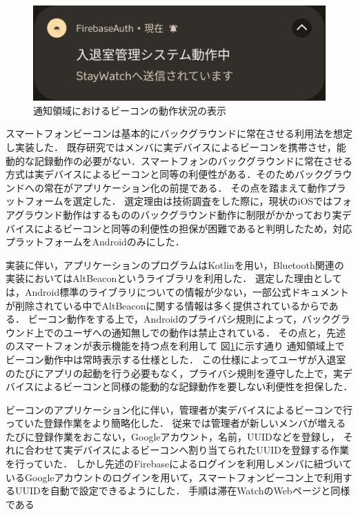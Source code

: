 \begin{figure}[tbh]
  \centering
  \includegraphics[width=12cm]{image/AppNofication.png}
  \caption{通知領域におけるビーコンの動作状況の表示}
  \label{fig:AppNofication}
\end{figure}


スマートフォンビーコンは基本的にバックグラウンドに常在させる利用法を想定し実装した．
既存研究ではメンバに実デバイスによるビーコンを携帯させ，能動的な記録動作の必要がない．スマートフォンのバックグラウンドに常在させる方式は実デバイスによるビーコンと同等の利便性がある．そのためバックグラウンドへの常在がアプリケーション化の前提である．
その点を踏まえて動作プラットフォームを選定した．
選定理由は技術調査をした際に，現状のiOSではフォアグラウンド動作はするもののバックグラウンド動作に制限がかかっており実デバイスによるビーコンと同等の利便性の担保が困難であると判明したため，対応プラットフォームをAndroidのみにした．

実装に伴い，アプリケーションのプログラムはKotlinを用い，Bluetooth関連の実装においてはAltBeaconというライブラリを利用した．
選定した理由としては，Android標準のライブラリについての情報が少ない，一部公式ドキュメントが削除されている中でAltBeaconに関する情報は多く提供されているからである．
ビーコン動作をする上で，Androidのプライバシ規則によって，バックグラウンド上でのユーザへの通知無しでの動作は禁止されている．
その点と，先述のスマートフォンが表示機能を持つ点を利用して 図\ref{fig:AppNofication}に示す通り   通知領域上でビーコン動作中は常時表示する仕様とした．
この仕様によってユーザが入退室のたびにアプリの起動を行う必要もなく，プライバシ規則を遵守した上で，実デバイスによるビーコンと同様の能動的な記録動作を要しない利便性を担保した．

ビーコンのアプリケーション化に伴い，管理者が実デバイスによるビーコンで行っていた登録作業をより簡略化した．
従来では管理者が新しいメンバが増えるたびに登録作業をおこない，Googleアカウント，名前，UUIDなどを登録し，
それに合わせて実デバイスによるビーコンへ割り当てられたUUIDを登録する作業を行っていた．
しかし先述のFirebaseによるログインを利用しメンバに紐づいているGoogleアカウントのログインを用いて，スマートフォンビーコン上で利用するUUIDを自動で設定できるようにした．
手順は滞在WatchのWebページと同様である

